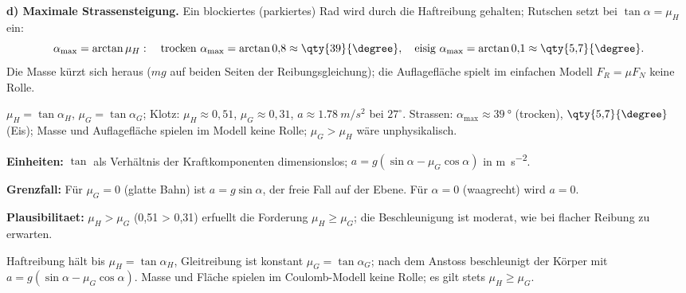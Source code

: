 \textbf{d) Maximale Strassensteigung.} Ein blockiertes (parkiertes) Rad
wird durch die Haftreibung gehalten; Rutschen setzt bei
$\tan\alpha=\mu_H$ ein:
\begin{equation}
  \alpha_{\max}=\arctan\mu_H: \quad
  \text{trocken } \alpha_{\max}=\arctan0{,}8\approx\qty{39}{\degree},
  \quad \text{eisig } \alpha_{\max}=\arctan0{,}1\approx\qty{5{,}7}{\degree}.
\end{equation}
Die Masse kürzt sich heraus ($mg$ auf beiden Seiten der
Reibungsgleichung); die Auflagefläche spielt im einfachen Modell
$F_R=\mu F_N$ keine Rolle.

\begin{ergebnis}
$\mu_H=\tan\alpha_H$, $\mu_G=\tan\alpha_G$; Klotz: $\mu_H\approx0{,}51$,
$\mu_G\approx0{,}31$, $a\approx\qty{1.78}{m/s^2}$ bei $27^\circ$.
Strassen: $\alpha_{\max}\approx\qty{39}{\degree}$ (trocken),
$\qty{5{,}7}{\degree}$ (Eis); Masse und Auflagefläche spielen im Modell
keine Rolle; $\mu_G>\mu_H$ w\"are unphysikalisch.
\end{ergebnis}

\begin{kontrolle}
\textbf{Einheiten:} $\tan$ als Verhältnis der Kraftkomponenten
dimensionslos; $a=g(\sin\alpha-\mu_G\cos\alpha)$ in \unit{\metre\per
\second\squared}. \checkmark

\textbf{Grenzfall:} Für $\mu_G=0$ (glatte Bahn) ist
$a=g\sin\alpha$, der freie Fall auf der Ebene. Für $\alpha=0$ (waagrecht)
wird $a=0$. \checkmark

\textbf{Plausibilitaet:} $\mu_H>\mu_G$ (0,51 > 0,31) erfuellt die
Forderung $\mu_H\ge\mu_G$; die Beschleunigung ist moderat, wie bei
flacher Reibung zu erwarten. \checkmark
\end{kontrolle}

\begin{merksatz}
Haftreibung hält bis $\mu_H=\tan\alpha_H$, Gleitreibung ist konstant
$\mu_G=\tan\alpha_G$; nach dem Anstoss beschleunigt der Körper mit
$a=g(\sin\alpha-\mu_G\cos\alpha)$. Masse und Fläche spielen im
Coulomb-Modell keine Rolle; es gilt stets $\mu_H\ge\mu_G$.
\end{merksatz}

